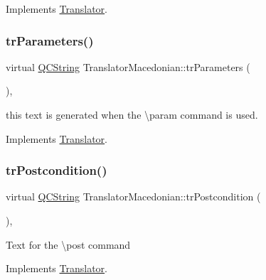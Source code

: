 Implements \mbox{\hyperlink{class_translator}{Translator}}.

\mbox{\label{class_translator_macedonian_a50aa0a8112d4bc48402829b90e1a9bdd}} 
\subsubsection{\texorpdfstring{trParameters()}{trParameters()}}
{\footnotesize\ttfamily virtual \mbox{\hyperlink{class_q_c_string}{Q\+C\+String}} Translator\+Macedonian\+::tr\+Parameters (\begin{DoxyParamCaption}{ }\end{DoxyParamCaption})\hspace{0.3cm}{\ttfamily [inline]}, {\ttfamily [virtual]}}

this text is generated when the \textbackslash{}param command is used. 

Implements \mbox{\hyperlink{class_translator}{Translator}}.

\mbox{\label{class_translator_macedonian_a6161eedff15be0faafec034f1c835784}} 
\subsubsection{\texorpdfstring{trPostcondition()}{trPostcondition()}}
{\footnotesize\ttfamily virtual \mbox{\hyperlink{class_q_c_string}{Q\+C\+String}} Translator\+Macedonian\+::tr\+Postcondition (\begin{DoxyParamCaption}{ }\end{DoxyParamCaption})\hspace{0.3cm}{\ttfamily [inline]}, {\ttfamily [virtual]}}

Text for the \textbackslash{}post command 

Implements \mbox{\hyperlink{class_translator}{Translator}}.

\mbox{\label{class_translator_macedonian_a1159c0efca01f0d0a1a681c79fc5eab0}} 
